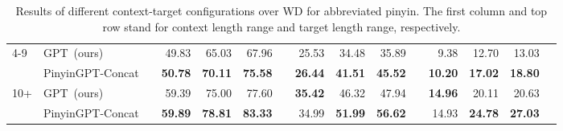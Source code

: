 \begin{table*}[t]
\begin{tabular}{llrrrrrrrrrrrrr}
\multirow{2}{*}{4-9} &GPT~(ours) & &49.83 &65.03 &67.96 & &25.53 &34.48 &35.89 & &9.38 &12.70 &13.03 \\
&PinyinGPT-Concat & &\textbf{50.78} &\textbf{70.11} &\textbf{75.58} &\textbf{} &\textbf{26.44} &\textbf{41.51} &\textbf{45.52} &\textbf{} &\textbf{10.20} &\textbf{17.02} &\textbf{18.80} \\\midrule
\multirow{2}{*}{10+} &GPT~(ours) & &59.39 &75.00 &77.60 & &\textbf{35.42} &46.32 &47.94 & &\textbf{14.96} &20.11 &20.63 \\
&PinyinGPT-Concat & &\textbf{59.89} &\textbf{78.81} &\textbf{83.33} &\textbf{} &34.99 &\textbf{51.99} &\textbf{56.62} &\textbf{} &14.93 &\textbf{24.78} &\textbf{27.03} \\
\bottomrule
\end{tabular}
\caption{Results of different context-target configurations over WD for abbreviated pinyin. The first column and top row stand for context length range and  target length range, respectively. }
\label{tab:length}
\end{table*}





